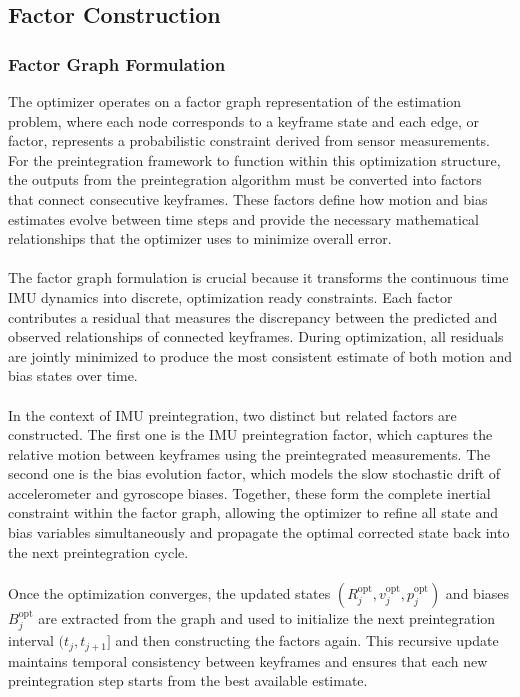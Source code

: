 \subsection{Factor Construction}
\subsubsection{Factor Graph Formulation}
The optimizer operates on a factor graph representation of the estimation problem, where each node corresponds to a keyframe state and each edge, or factor, represents a probabilistic constraint derived from sensor measurements. For the preintegration framework to function within this optimization structure, the outputs from the preintegration algorithm must be converted into factors that connect consecutive keyframes. These factors define how motion and bias estimates evolve between time steps and provide the necessary mathematical relationships that the optimizer uses to minimize overall error.  
\\ \\
The factor graph formulation is crucial because it transforms the continuous time IMU dynamics into discrete, optimization ready constraints. Each factor contributes a residual that measures the discrepancy between the predicted and observed relationships of connected keyframes. During optimization, all residuals are jointly minimized to produce the most consistent estimate of both motion and bias states over time.  
\\ \\
In the context of IMU preintegration, two distinct but related factors are constructed. The first one is the IMU preintegration factor, which captures the relative motion between keyframes using the preintegrated measurements. The second one is the bias evolution factor, which models the slow stochastic drift of accelerometer and gyroscope biases. Together, these form the complete inertial constraint within the factor graph, allowing the optimizer to refine all state and bias variables simultaneously and propagate the optimal corrected state back into the next preintegration cycle.  
\\ \\
Once the optimization converges, the updated states $(R_j^{\text{opt}}, v_j^{\text{opt}}, p_j^{\text{opt}})$ and biases $B_j^{\text{opt}}$ are extracted from the graph and used to initialize the next preintegration interval $(t_j, t_{j+1}]$ and then constructing the factors again. This recursive update maintains temporal consistency between keyframes and ensures that each new preintegration step starts from the best available estimate.



